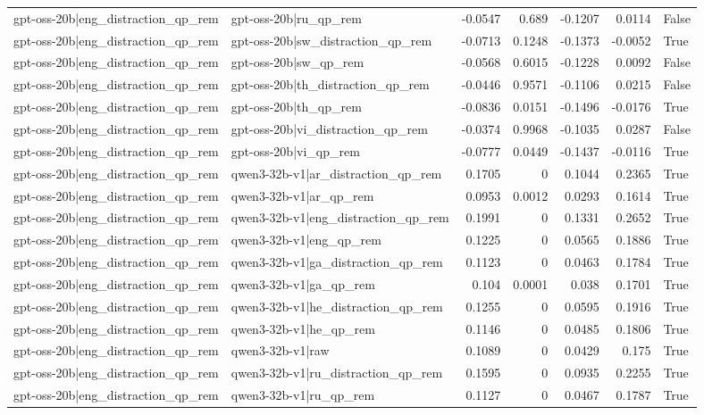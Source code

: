 \begin{table}
\begin{tabular}{l l r r r r l}
gpt-oss-20b|eng_distraction_qp_rem & gpt-oss-20b|ru_qp_rem & -0.0547 & 0.689 & -0.1207 & 0.0114 & False \\
gpt-oss-20b|eng_distraction_qp_rem & gpt-oss-20b|sw_distraction_qp_rem & -0.0713 & 0.1248 & -0.1373 & -0.0052 & True \\
gpt-oss-20b|eng_distraction_qp_rem & gpt-oss-20b|sw_qp_rem & -0.0568 & 0.6015 & -0.1228 & 0.0092 & False \\
gpt-oss-20b|eng_distraction_qp_rem & gpt-oss-20b|th_distraction_qp_rem & -0.0446 & 0.9571 & -0.1106 & 0.0215 & False \\
gpt-oss-20b|eng_distraction_qp_rem & gpt-oss-20b|th_qp_rem & -0.0836 & 0.0151 & -0.1496 & -0.0176 & True \\
gpt-oss-20b|eng_distraction_qp_rem & gpt-oss-20b|vi_distraction_qp_rem & -0.0374 & 0.9968 & -0.1035 & 0.0287 & False \\
gpt-oss-20b|eng_distraction_qp_rem & gpt-oss-20b|vi_qp_rem & -0.0777 & 0.0449 & -0.1437 & -0.0116 & True \\
gpt-oss-20b|eng_distraction_qp_rem & qwen3-32b-v1|ar_distraction_qp_rem & 0.1705 & 0 & 0.1044 & 0.2365 & True \\
gpt-oss-20b|eng_distraction_qp_rem & qwen3-32b-v1|ar_qp_rem & 0.0953 & 0.0012 & 0.0293 & 0.1614 & True \\
gpt-oss-20b|eng_distraction_qp_rem & qwen3-32b-v1|eng_distraction_qp_rem & 0.1991 & 0 & 0.1331 & 0.2652 & True \\
gpt-oss-20b|eng_distraction_qp_rem & qwen3-32b-v1|eng_qp_rem & 0.1225 & 0 & 0.0565 & 0.1886 & True \\
gpt-oss-20b|eng_distraction_qp_rem & qwen3-32b-v1|ga_distraction_qp_rem & 0.1123 & 0 & 0.0463 & 0.1784 & True \\
gpt-oss-20b|eng_distraction_qp_rem & qwen3-32b-v1|ga_qp_rem & 0.104 & 0.0001 & 0.038 & 0.1701 & True \\
gpt-oss-20b|eng_distraction_qp_rem & qwen3-32b-v1|he_distraction_qp_rem & 0.1255 & 0 & 0.0595 & 0.1916 & True \\
gpt-oss-20b|eng_distraction_qp_rem & qwen3-32b-v1|he_qp_rem & 0.1146 & 0 & 0.0485 & 0.1806 & True \\
gpt-oss-20b|eng_distraction_qp_rem & qwen3-32b-v1|raw & 0.1089 & 0 & 0.0429 & 0.175 & True \\
gpt-oss-20b|eng_distraction_qp_rem & qwen3-32b-v1|ru_distraction_qp_rem & 0.1595 & 0 & 0.0935 & 0.2255 & True \\
gpt-oss-20b|eng_distraction_qp_rem & qwen3-32b-v1|ru_qp_rem & 0.1127 & 0 & 0.0467 & 0.1787 & True \\

\end{tabular}
\end{table}
